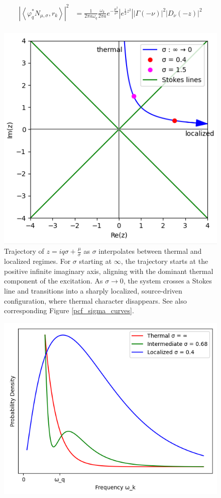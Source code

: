 \documentclass[12pt,a4paper]{article}
\begin{document}
{\begin{equation}
  \begin{aligned}
    \left|\left< \varphi^*_q N_{\mu,\sigma}, r_k \right>\right|^2 &= \frac{1}{2\pi a \omega_q} \frac{\omega_k}{2\pi a} e^{-\frac{\mu^2}{\sigma^2}} \left| e^{\frac{1}{2} z^2} \right| \left| \Gamma(-\nu) \right|^2 \left| D_\nu(-z) \right|^2 \\
  \end{aligned}
\label{pcf}
\end{equation}
\begin{figure}[h]
\centering
\includegraphics[scale=0.5]{stokes.png}
\caption{Trajectory of $z = i q \sigma + \frac{\mu}{\sigma}$ as $\sigma$ interpolates between thermal and localized regimes. For $\sigma$ starting at $\infty$, the trajectory starts at the positive infinite imaginary axis, aligning with the dominant thermal component of the excitation. As $\sigma \to 0$, the system crosses a Stokes line and transitions into a sharply localized, source-driven configuration, where thermal character disappears. See also corresponding Figure \ref{pcf_sigma_curves}.}
\label{stokes}
\end{figure}
\begin{figure}
\centering
\includegraphics[scale=0.5]{pcf.png}

\end{figure}}
\end{document}
